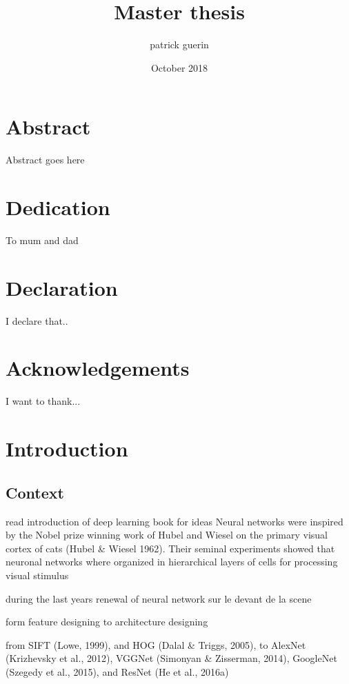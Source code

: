 \documentclass[11pt, onecolumn, a4paper]{report}
\title{Master thesis}
\author{patrick guerin}
\date{October 2018}
\begin{document}
\maketitle

\chapter*{Abstract}
Abstract goes here
 
\chapter*{Dedication}
To mum and dad
 
\chapter*{Declaration}
I declare that..
 
\chapter*{Acknowledgements}
I want to thank...

\tableofcontents


\chapter{Introduction}

\section*{Context}

read introduction of deep learning book for ideas
Neural networks were inspired by the Nobel prize winning work of Hubel and
Wiesel on the primary visual cortex of cats (Hubel & Wiesel 1962). Their seminal
experiments showed that neuronal networks where organized in hierarchical layers
of cells for processing visual stimulus



during the last years renewal of neural network  sur le devant de la scene

form feature designing to architecture designing

from SIFT (Lowe, 1999), and HOG (Dalal & Triggs, 2005), to AlexNet (Krizhevsky
et al., 2012), VGGNet (Simonyan & Zisserman, 2014), GoogleNet (Szegedy et al., 2015), and
ResNet (He et al., 2016a)
\end{document}
